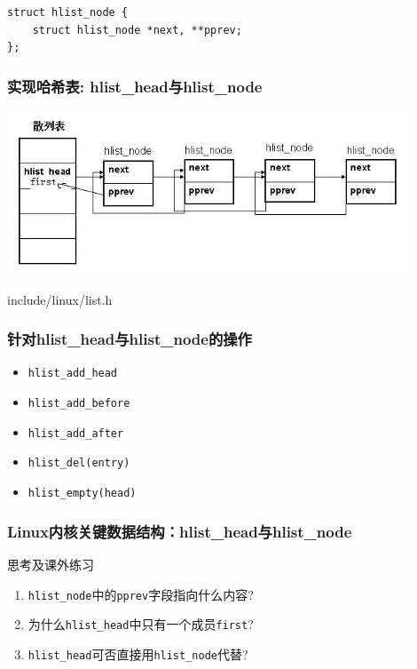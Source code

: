 \documentclass[xcolor=svgnames]{beamer}
\begin{document}
\begin{CJK*}{UTF8}{gbsn}
{\begin{lstlisting}[tabsize=8,basicstyle=\ttfamily]
struct hlist_node {
    struct hlist_node *next, **pprev;
};
\end{lstlisting}
}
\begin{frame}[fragile]
\frametitle{实现哈希表: hlist\_head与hlist\_node}
\includegraphics[width=0.9\textwidth]{hlist.jpeg}
\begin{block}{include/linux/list.h}
\lsthlist
\end{block}
\end{frame}

\begin{frame}[fragile]
\frametitle{针对hlist\_head与hlist\_node的操作}
\begin{itemize}
\item \verb|hlist_add_head|
\item \verb|hlist_add_before|
\item \verb|hlist_add_after|
\item \verb|hlist_del(entry)|
\item \verb|hlist_empty(head)| 
\end{itemize}
\end{frame}

\begin{frame}[fragile]
\frametitle{Linux内核关键数据结构：hlist\_head与hlist\_node}
\begin{block}{思考及课外练习}
%
\begin{enumerate}
\item \verb|hlist_node|中的\verb|pprev|字段指向什么内容?
\item 为什么\verb|hlist_head|中只有一个成员\verb|first|?
\item \verb|hlist_head|可否直接用\verb|hlist_node|代替?
\end{enumerate}
\end{block}
\end{frame}


\end{CJK*}
\end{document}
